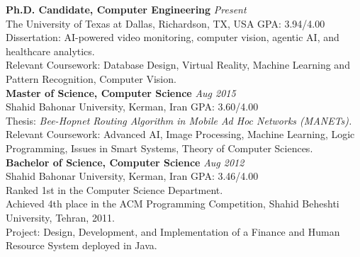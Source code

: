 \documentclass[10pt,a4paper,sans]{moderncv}
\begin{document}
{\textbf{Ph.D. Candidate, Computer Engineering} \hfill \textit{Present}\\
The University of Texas at Dallas, Richardson, TX, USA \hfill GPA: 3.94/4.00\\[1pt]
Dissertation: AI-powered video monitoring, computer vision, agentic AI, and healthcare analytics.\\[1pt]
Relevant Coursework: Database Design, Virtual Reality, Machine Learning and Pattern Recognition, Computer Vision.
}\\[5pt]
{\textbf{Master of Science, Computer Science} \hfill \textit{Aug 2015}\\
Shahid Bahonar University, Kerman, Iran \hfill GPA: 3.60/4.00\\[1pt]
Thesis: \textit{Bee-Hopnet Routing Algorithm in Mobile Ad Hoc Networks (MANETs).}\\[1pt]
Relevant Coursework: Advanced AI, Image Processing, Machine Learning, Logic Programming, Issues in Smart Systems, Theory of Computer Sciences.
}\\[5pt]
{\textbf{Bachelor of Science, Computer Science} \hfill \textit{Aug 2012}\\
Shahid Bahonar University, Kerman, Iran \hfill GPA: 3.46/4.00\\[1pt]
Ranked 1st in the Computer Science Department.\\[1pt]
Achieved 4th place in the ACM Programming Competition, Shahid Beheshti University, Tehran, 2011.\\[1pt]
Project: Design, Development, and Implementation of a Finance and Human Resource System deployed in Java.
}

\vspace*{-3mm}


\end{document}

